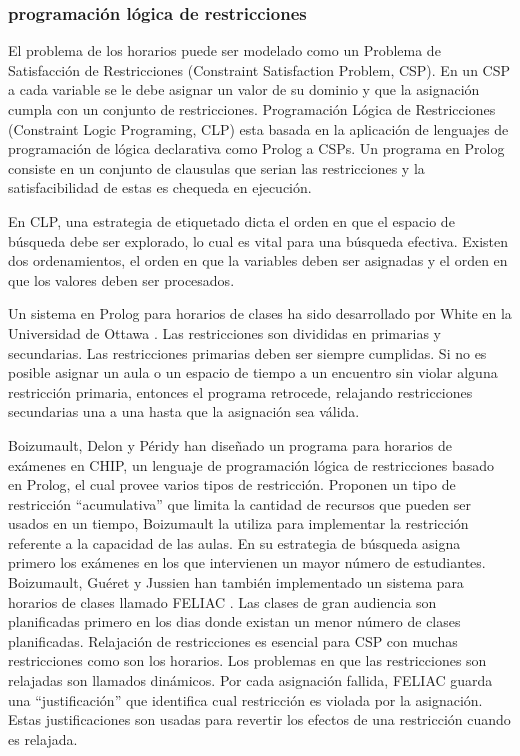\subsubsection{programación lógica de restricciones}

El problema de los horarios puede ser modelado como un Problema de Satisfacción de Restricciones (Constraint Satisfaction Problem, CSP). En un CSP a cada variable se le debe asignar un valor de su dominio y que la asignación cumpla con un conjunto de restricciones. Programación Lógica de Restricciones (Constraint Logic Programing, CLP) esta basada en la aplicación de lenguajes de programación de lógica declarativa como Prolog a CSPs. Un programa en Prolog consiste en un conjunto de clausulas que serian las restricciones y la satisfacibilidad de estas es chequeda en ejecución.

En CLP, una estrategia de etiquetado dicta el orden en que el espacio de búsqueda debe ser explorado, lo cual es vital para una búsqueda efectiva. Existen dos ordenamientos, el orden en que la variables deben ser asignadas y el orden en que los valores deben ser procesados.

Un sistema en Prolog para horarios de clases ha sido desarrollado por White en la Universidad de Ottawa \cite{L Kang and GM White, C Cheng and L Kang and N Leung and GM White}. Las restricciones son divididas en primarias y secundarias. Las restricciones primarias deben ser siempre cumplidas. Si no es posible asignar un aula o un espacio de tiempo a un encuentro sin violar alguna restricción primaria, entonces el programa retrocede, relajando restricciones secundarias una a una hasta que la asignación sea válida.

Boizumault, Delon y P\'eridy han diseñado un programa para horarios de exámenes \cite{P Boizumault and Y Delon and L Peridy} en CHIP, un lenguaje de programación lógica de restricciones basado en Prolog, el cual provee varios tipos de restricción. Proponen un tipo de restricción ``acumulativa'' que limita la cantidad de recursos que pueden ser usados en un tiempo, Boizumault la utiliza para implementar la restricción referente a la capacidad de las aulas. En su estrategia de búsqueda asigna primero los exámenes en los que intervienen un mayor número de estudiantes. Boizumault, Gu\'eret y Jussien han tambi\'en implementado un sistema para horarios de clases llamado FELIAC \cite{P Boizumault and C Gueret and N Jussien, C Gueret and N Jussien and P Boizumault and C Prins}. Las clases de gran audiencia son planificadas primero en los dias donde existan un menor número de clases planificadas. Relajación de restricciones es esencial para CSP con muchas restricciones como son los horarios. Los problemas en que las restricciones son relajadas son llamados dinámicos. Por cada asignación fallida, FELIAC guarda una ``justificación'' que identifica cual restricción es violada por la asignación. Estas justificaciones son usadas para revertir los efectos de una restricción cuando es relajada.

